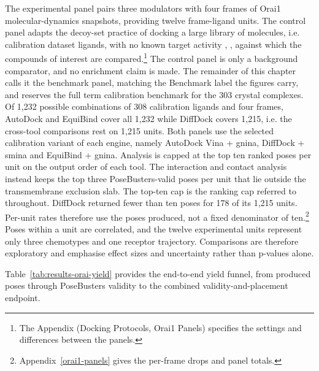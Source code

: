 The experimental panel pairs three modulators with four frames of Orai1 molecular-dynamics snapshots, providing twelve frame-ligand units. The control panel adapts the decoy-set practice of docking a large library of molecules, i.e. calibration dataset ligands, with no known target activity \cite{ref045}, \cite{ref046}, against which the compounds of interest are compared.\footnote{The Appendix (Docking Protocols, Orai1 Panels) specifies the settings and differences between the panels.} The control panel is only a background comparator, and no enrichment claim is made. The remainder of this chapter calls it the benchmark panel, matching the Benchmark label the figures carry, and reserves the full term calibration benchmark for the 303 crystal complexes. Of 1,232 possible combinations of 308 calibration ligands and four frames, AutoDock and EquiBind cover all 1,232 while DiffDock covers 1,215, i.e. the cross-tool comparisons rest on 1,215 units. Both panels use the selected calibration variant of each engine, namely AutoDock Vina + gnina, DiffDock + smina and EquiBind + gnina. Analysis is capped at the top ten ranked poses per unit on the output order of each tool. The interaction and contact analysis instead keeps the top three PoseBusters-valid poses per unit that lie outside the transmembrane exclusion slab. The top-ten cap is the ranking cap referred to throughout. DiffDock returned fewer than ten poses for 178 of its 1,215 units. Per-unit rates therefore use the poses produced, not a fixed denominator of ten.\footnote{Appendix~\ref{orai1-panels} gives the per-frame drops and panel totals.} Poses within a unit are correlated, and the twelve experimental units represent only three chemotypes and one receptor trajectory. Comparisons are therefore exploratory and emphasise effect sizes and uncertainty rather than p-values alone.

Table~\ref{tab:results-orai-yield} provides the end-to-end yield funnel, from produced poses through PoseBusters validity to the combined validity-and-placement endpoint.


